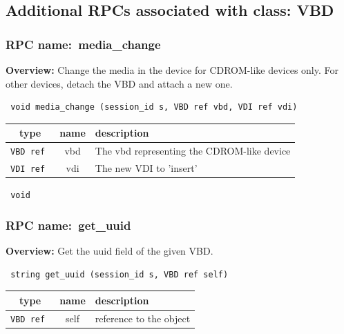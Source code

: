 \subsection{Additional RPCs associated with class: VBD}
\subsubsection{RPC name:~media\_change}

{\bf Overview:} 
Change the media in the device for CDROM-like devices only. For other
devices, detach the VBD and attach a new one.

\begin{verbatim} void media_change (session_id s, VBD ref vbd, VDI ref vdi)\end{verbatim}



 
\vspace{0.3cm}
\begin{tabular}{|c|c|p{7cm}|}
 \hline
{\bf type} & {\bf name} & {\bf description} \\ \hline
{\tt VBD ref } & vbd & The vbd representing the CDROM-like device \\ \hline 

{\tt VDI ref } & vdi & The new VDI to 'insert' \\ \hline 

\end{tabular}

\vspace{0.3cm}

{\tt 
void
}



\vspace{0.3cm}
\vspace{0.3cm}
\vspace{0.3cm}
\subsubsection{RPC name:~get\_uuid}

{\bf Overview:} 
Get the uuid field of the given VBD.

\begin{verbatim} string get_uuid (session_id s, VBD ref self)\end{verbatim}



 
\vspace{0.3cm}
\begin{tabular}{|c|c|p{7cm}|}
 \hline
{\bf type} & {\bf name} & {\bf description} \\ \hline
{\tt VBD ref } & self & reference to the object \\ \hline 

\end{tabular}

